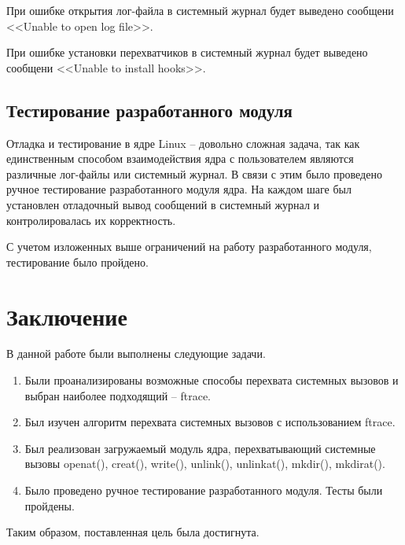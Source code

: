 \documentclass[a4paper,14pt]{article}
\begin{document}
При ошибке открытия лог-файла в системный журнал будет выведено сообщени <<Unable to open log file>>.

При ошибке установки перехватчиков в системный журнал будет выведено сообщени <<Unable to install hooks>>.

\subsection{Тестирование разработанного модуля}

Отладка и тестирование в ядре Linux -- довольно сложная задача, так как единственным способом взаимодействия ядра с пользователем являются различные лог-файлы или системный журнал. В связи с этим было проведено ручное тестирование разработанного модуля ядра. На каждом шаге был установлен отладочный вывод сообщений в системный журнал и контролировалась их корректность.

С учетом изложенных выше ограничений на работу разработанного модуля, тестирование было пройдено.

\newpage
\section*{Заключение}

В данной работе были выполнены следующие задачи.

\begin{enumerate}
	\item Были проанализированы возможные способы перехвата системных вызовов и выбран наиболее подходящий -- ftrace.
	\item Был изучен алгоритм перехвата системных вызовов с использованием ftrace.
	\item Был реализован загружаемый модуль ядра, перехватывающий системные вызовы openat(), creat(), write(), unlink(), unlinkat(), mkdir(), mkdirat().
	\item Было проведено ручное тестирование разработанного модуля. Тесты были пройдены.
\end{enumerate}

Таким образом, поставленная цель была достигнута.
\end{document}
